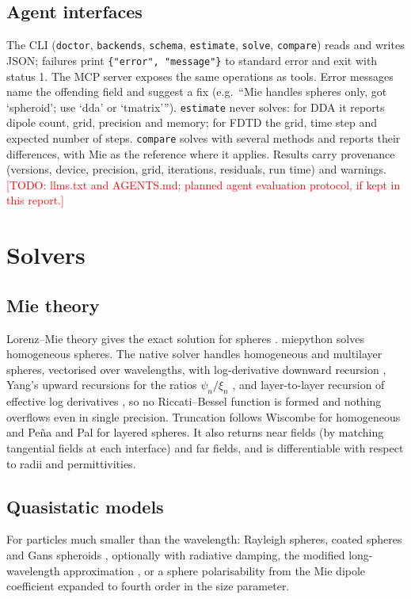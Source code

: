 \documentclass[11pt]{article}
\newcommand{\todo}[1]{\textcolor{red}{[TODO: #1]}}
\newcommand{\code}[1]{\texttt{#1}}
\begin{document}
\subsection{Agent interfaces}
The CLI (\code{doctor}, \code{backends}, \code{schema}, \code{estimate}, \code{solve},
\code{compare}) reads and writes JSON; failures print \code{\{"error", "message"\}} to standard error
and exit with status 1. The MCP server exposes the same operations as tools. Error messages name the
offending field and suggest a fix (e.g.\ ``Mie handles spheres only, got `spheroid'; use `dda' or
`tmatrix'{}''). \code{estimate} never solves: for DDA it reports dipole count, grid, precision and
memory; for FDTD the grid, time step and expected number of steps. \code{compare} solves with several
methods and reports their differences, with Mie as the reference where it applies. Results carry
provenance (versions, device, precision, grid, iterations, residuals, run time) and warnings.
\todo{llms.txt and AGENTS.md; planned agent evaluation protocol, if kept in this report.}

\section{Solvers}
\label{sec:solvers}

\subsection{Mie theory}
Lorenz--Mie theory gives the exact solution for spheres \cite{Mie1908,BohrenHuffman1998}. miepython \cite{Prahl2023miepython} solves homogeneous spheres. The native solver handles
homogeneous and multilayer spheres, vectorised over wavelengths, with log-derivative downward
recursion \cite{Wiscombe1980}, Yang's upward recursions for the ratios $\psi_n/\xi_n$
\cite{Yang2003}, and layer-to-layer recursion of effective log derivatives
\cite{Yang2003,PenaPal2009}, so no Riccati--Bessel function is formed and nothing overflows even in
single precision. Truncation follows Wiscombe \cite{Wiscombe1980} for homogeneous and Pe\~na and Pal
\cite{PenaPal2009} for layered spheres. It also returns near fields (by matching tangential fields
at each interface) and far fields, and is differentiable with respect to radii and permittivities.

\subsection{Quasistatic models}
For particles much smaller than the wavelength: Rayleigh spheres, coated spheres and Gans spheroids
\cite{BohrenHuffman1998}, optionally with radiative damping, the modified long-wavelength
approximation \cite{MeierWokaun1983,Kelly2003}, or a sphere polarisability from the Mie dipole
coefficient expanded to fourth order in the size parameter.
\end{document}

